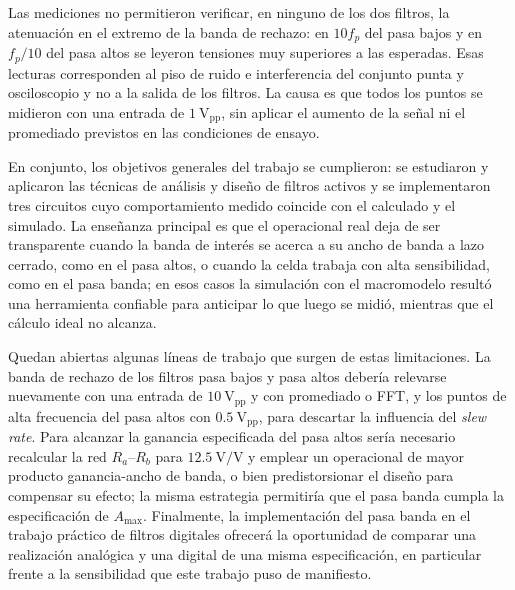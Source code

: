 Las mediciones no permitieron verificar, en ninguno de los dos filtros, la atenuación en el extremo de la banda de
rechazo: en $10 f_p$ del pasa bajos y en $f_p/10$ del pasa altos se leyeron tensiones muy superiores a las
esperadas. Esas lecturas corresponden al piso de ruido e interferencia del conjunto punta y osciloscopio y no a la salida de los
filtros. La causa es que todos los puntos se midieron con una entrada de $\SI{1}{\volt_{\text{pp}}}$, sin aplicar el
aumento de la señal ni el promediado previstos en las condiciones de ensayo.

En conjunto, los objetivos generales del trabajo se cumplieron: se estudiaron y aplicaron las técnicas de análisis y
diseño de filtros activos y se implementaron tres circuitos cuyo comportamiento medido coincide con el calculado y el
simulado. La enseñanza principal es que el operacional real deja de ser transparente cuando la banda de interés se
acerca a su ancho de banda a lazo cerrado, como en el pasa altos, o cuando la celda trabaja con alta sensibilidad,
como en el pasa banda; en esos casos la simulación con el macromodelo resultó una herramienta confiable para
anticipar lo que luego se midió, mientras que el cálculo ideal no alcanza.

Quedan abiertas algunas líneas de trabajo que surgen de estas limitaciones. La banda de rechazo de los filtros pasa
bajos y pasa altos debería relevarse nuevamente con una entrada de $\SI{10}{\volt_{\text{pp}}}$ y con promediado o
FFT, y los puntos de alta frecuencia del pasa altos con $\SI{0.5}{\volt_{\text{pp}}}$, para descartar la influencia
del \emph{slew rate}. Para alcanzar la ganancia especificada del pasa altos sería
necesario recalcular la red $R_a$--$R_b$ para $\SI{12.5}{\volt/\volt}$ y emplear un operacional de mayor producto
ganancia-ancho de banda, o bien predistorsionar el diseño para compensar su efecto; la misma estrategia permitiría
que el pasa banda cumpla la especificación de $A_{\max}$. Finalmente, la implementación del pasa banda en el trabajo
práctico de filtros digitales ofrecerá la oportunidad de comparar una realización analógica y una digital de una misma
especificación, en particular frente a la sensibilidad que este trabajo puso de manifiesto.
